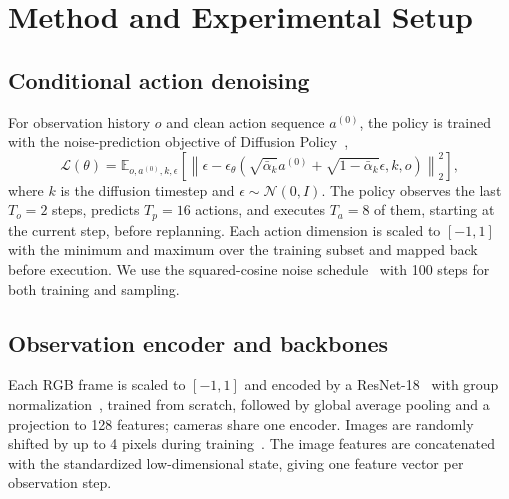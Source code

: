 %
\section{Method and Experimental Setup}
\label{sec:method}
\subsection{Conditional action denoising}
For observation history $o$ and clean action sequence $a^{(0)}$, the policy is
trained with the noise-prediction objective of Diffusion
Policy~\citep{chi2023diffusion,ho2020ddpm},
\begin{equation}
  \mathcal{L}(\theta)=
  \mathbb{E}_{o,a^{(0)},k,\epsilon}
  \left[\left\|\epsilon-
  \epsilon_\theta\!\left(
  \sqrt{\bar\alpha_k}a^{(0)}+
  \sqrt{1-\bar\alpha_k}\epsilon,k,o\right)
  \right\|_2^2\right],
  \label{eq:denoising}
\end{equation}
where $k$ is the diffusion timestep and $\epsilon\sim\mathcal{N}(0,I)$. The
policy observes the last $T_o=2$ steps, predicts $T_p=16$ actions, and executes
$T_a=8$ of them, starting at the current step, before replanning. Each action
dimension is scaled to $[-1,1]$ with the minimum and maximum over the training
subset and mapped back before execution. We use the squared-cosine
noise schedule~\citep{nichol2021improved} with 100 steps for both training and
sampling.

\subsection{Observation encoder and backbones}
Each RGB frame is scaled to $[-1,1]$ and encoded by a
ResNet-18~\citep{he2016resnet} with group normalization~\citep{wu2018groupnorm},
trained from scratch, followed by global average pooling and a projection to
128 features; cameras share one encoder. Images are randomly shifted by up to
4 pixels during training~\citep{kostrikov2021drq}. The image features are concatenated
with the standardized low-dimensional state, giving one feature vector per
observation step.

